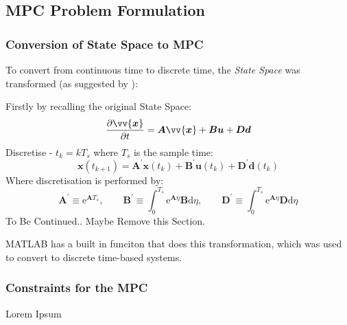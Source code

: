 \subsection{MPC Problem Formulation}
\subsubsection{Conversion of State Space to MPC}
\label{sec:mpc}

To convert from continuous time to discrete time, the \emph{State Space} was transformed (as suggested by \cite{power:mpcform}):

Firstly by recalling the original State Space:
\begin{equation}
        \frac{\partial \vv{\bm{x}}}{\partial t} = \bm{A} \vv{\bm{x}} + \bm{B} \bm{u} + \bm{D} \bm{d}
\end{equation}
Discretise - $t_k = kT_s$ where $T_s$ is the sample time:
\begin{equation}
        \bm{x}(t_{k+1}) = \bm{A}^{\prime} \bm{x}(t_k) + \bm{B}^{\prime}\bm{u}(t_k) + \bm{D}^{\prime}\bm{d}(t_k)
\end{equation}
Where discretisation is performed by:
\begin{equation}
        \bm{A}^{\prime} \equiv \mathrm{e}^{\bm{A}T_s}
        , \qquad \bm{B}^{\prime} \equiv \int^{T_s}_0\mathrm{e}^{\bm{A} \eta} \bm{B} \mathrm{d} \eta ,
        \qquad \bm{D}^{\prime} \equiv \int^{T_s}_0\mathrm{e}^{\bm{A} \eta} \bm{D} \mathrm{d} \eta
\end{equation}
{\color{red}To Be Continued.. Maybe Remove this Section.}

MATLAB has a built in funciton that does this transformation,  which was used to convert to discrete time-based systems.

\subsubsection{Constraints for the MPC}
Lorem Ipsum


